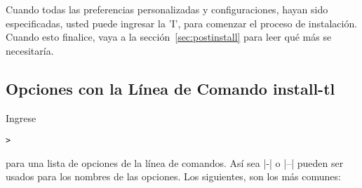 \documentclass{article}
\begin{document}
Cuando todas las preferencias personalizadas y configuraciones, hayan
sido especificadas, usted puede ingresar la 'I', para comenzar el
proceso de instalación.  Cuando esto finalice, vaya a la
sección~\ref{sec:postinstall} para leer qué más se necesitaría. 

\subsection{Opciones con la Línea de Comando install-tl}
\label{sec:cmdline}

Ingrese 
\begin{alltt}
	> 
\end{alltt}
para una lista de opciones de la línea de comandos. Así sea |-| o |--|
pueden ser usados para los nombres de las opciones. Los siguientes,
son los más comunes:
\end{document}
